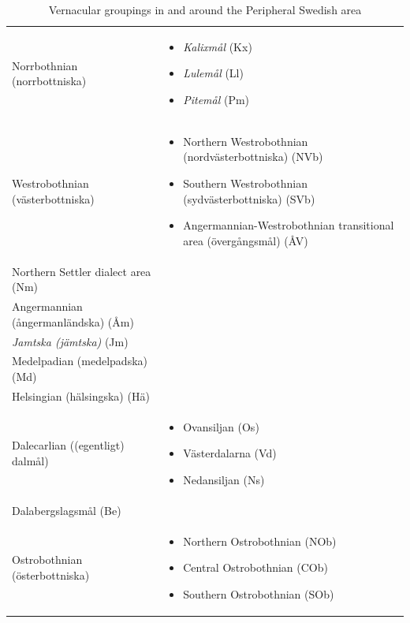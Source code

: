\begin{table}
\caption{Vernacular groupings in and around the Peripheral Swedish area}
\small 
\begin{tabular}{p{}l}
\lsptoprule
Norrbothnian (norrbottniska) &
      \parbox{.5\textwidth}{
	  \begin{itemize}
  \setlength{\itemsep}{0pt}
	  \item  \textit{Kalixmål} (Kx)
	  \item  \textit{Lulemål} (Ll)
	  \item  \textit{Pitemål} (Pm)
	  \end{itemize}
      }
\\
Westrobothnian (västerbottniska) &
      \parbox{.5\textwidth}{
	  \begin{itemize}
  \setlength{\itemsep}{0pt}
	  \item Northern Westrobothnian (nordvästerbottniska) (NVb)
	  \item Southern Westrobothnian
		(sydvästerbottniska) (SVb)
	  \item Angermannian-Westrobothnian
		transitional area (övergångsmål) (ÅV)
	  \end{itemize}
}
\\
Northern Settler dialect area (Nm)  
\\
Angermannian (ångermanländska) (Åm)  
\\
\textit{Jamtska (jämtska)} (Jm)  
\\
Medelpadian (medelpadska) (Md)  
\\
Helsingian (hälsingska) (Hä)  
\\
Dalecarlian ((egentligt) dalmål) &
      \parbox{.5\textwidth}{
	  \begin{itemize} 
  \setlength{\itemsep}{0pt}
	      \item Ovansiljan (Os)
	      \item Västerdalarna (Vd)
	      \item Nedansiljan (Ns)
	  \end{itemize}
}
\\
Dalabergslagsmål (Be)  
\\
Ostrobothnian (österbottniska) &
      \parbox{.5\textwidth}{
	  \begin{itemize} 
  \setlength{\itemsep}{0pt}
	  \item Northern Ostrobothnian (NOb)
	  \item Central Ostrobothnian (COb)
	  \item Southern Ostrobothnian (SOb)
	  \end{itemize}
}
\end{tabular}
\end{table}
